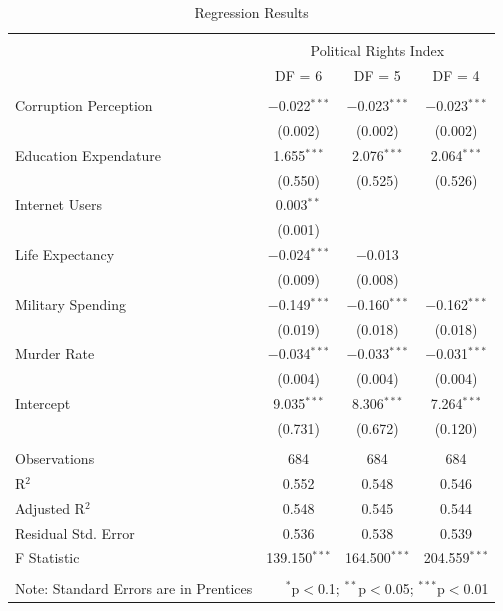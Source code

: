 \documentclass[
  english,
  man,floatsintext]{apa6}
\begin{document}
\begin{table}[!htbp] \centering 
  \caption{Regression Results} 
  \label{} 
\begin{tabular}{@{\extracolsep{5pt}}lccc} 
\\[-1.8ex]\hline 
\hline \\[-1.8ex] 
 & \multicolumn{3}{c}{Political Rights Index} \\ 
\cline{2-4} 
 & DF = 6 & DF = 5 & DF = 4 \\ 
\hline \\[-1.8ex] 
 Corruption Perception & $-$0.022$^{***}$ & $-$0.023$^{***}$ & $-$0.023$^{***}$ \\ 
  & (0.002) & (0.002) & (0.002) \\ 
  Education Expendature & 1.655$^{***}$ & 2.076$^{***}$ & 2.064$^{***}$ \\ 
  & (0.550) & (0.525) & (0.526) \\ 
  Internet Users & 0.003$^{**}$ &  &  \\ 
  & (0.001) &  &  \\ 
  Life Expectancy & $-$0.024$^{***}$ & $-$0.013 &  \\ 
  & (0.009) & (0.008) &  \\ 
  Military Spending & $-$0.149$^{***}$ & $-$0.160$^{***}$ & $-$0.162$^{***}$ \\ 
  & (0.019) & (0.018) & (0.018) \\ 
  Murder Rate & $-$0.034$^{***}$ & $-$0.033$^{***}$ & $-$0.031$^{***}$ \\ 
  & (0.004) & (0.004) & (0.004) \\ 
  Intercept & 9.035$^{***}$ & 8.306$^{***}$ & 7.264$^{***}$ \\ 
  & (0.731) & (0.672) & (0.120) \\ 
 \hline \\[-1.8ex] 
Observations & 684 & 684 & 684 \\ 
R$^{2}$ & 0.552 & 0.548 & 0.546 \\ 
Adjusted R$^{2}$ & 0.548 & 0.545 & 0.544 \\ 
Residual Std. Error & 0.536 & 0.538 & 0.539 \\ 
F Statistic & 139.150$^{***}$ & 164.500$^{***}$ & 204.559$^{***}$ \\ 
\hline 
\hline \\[-1.8ex] 
Note: Standard Errors are in Prentices & \multicolumn{3}{r}{$^{*}$p$<$0.1; $^{**}$p$<$0.05; $^{***}$p$<$0.01} \\ 
\end{tabular} 
\end{table}
\end{document}
